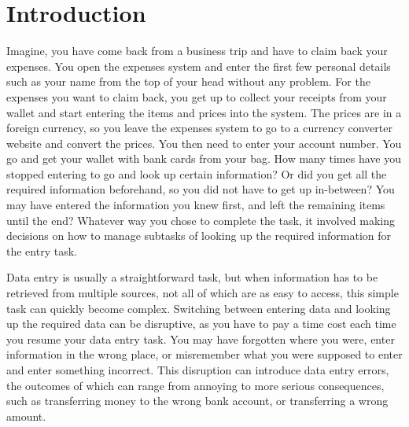 \documentclass[11pt,oneside]{report}
\begin{document}
\tableofcontents
\listoffigures
\listoftables
\chapter{Introduction}

\vspace{10pt}


 
Imagine, you have come back from a business trip and have to claim back your expenses. You open the expenses system and enter the first few personal details such as your name from the top of your head without any problem. For the expenses you want to claim back, you get up to collect your receipts from your wallet and start entering the items and prices into the system. The prices are in a foreign currency, so you leave the expenses system to go to a currency converter website and convert the prices. You then need to enter your account number. You go and get your wallet with bank cards from your bag. How many times have you stopped entering to go and look up certain information? Or did you get all the required information beforehand, so you did not have to get up in-between? You may have entered the information you knew first, and left the remaining items until the end? Whatever way you chose to complete the task, it involved making decisions on how to manage subtasks of looking up the required information for the entry task. 

Data entry is usually a straightforward task, but when information has to be retrieved from multiple sources, not all of which are as easy to access, this simple task can quickly become complex. Switching between entering data and looking up the required data can be disruptive, as you have to pay a time cost 
each time you resume your data entry task. You may have forgotten where you were, enter information in the wrong place, or misremember what you were supposed to enter and enter something incorrect. This disruption can introduce data entry errors, the outcomes of which can range from annoying to more serious consequences, such as transferring money to the wrong bank account, or transferring a wrong amount.  
\end{document}
